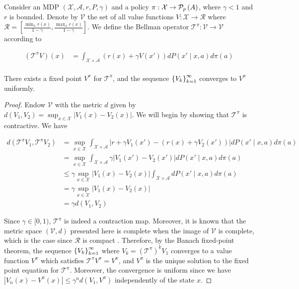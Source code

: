 \begin{theorem}
  Consider an MDP $(\mathcal{X}, \mathcal{A}, r, P, \gamma)$ and a
  policy $\pi:\mathcal{X}\to\probset{A}$, where $\gamma<1$ and $r$ is
  bounded.
  Denote by $\mathcal{V}$ the
  set of all value functions $V:\mathcal{X}\to\mathcal{R}$ where
  $\mathcal{R}=[\frac{\min_x r(x)}{1-\gamma}, \frac{\max_x r(x)}{1-\gamma}]$.
  We define the Bellman
  operator $\mathcal{T}^\pi:\mathcal{V}\to\mathcal{V}$ according to

  \begin{align*}
    (\mathcal{T}^\pi V)(x) &=
                             \int_{\mathcal{X}\times\mathcal{A}}\left(r(x)
                             + \gamma V(x')\right)dP(x'\mid x, a)d\pi(a)\\
  \end{align*}

  There exists a fixed point $V^\pi$ for $\mathcal{T}^\pi$, and the
  sequence $\indexedint{k}{\infty}{V}$ converges to $V^\pi$ uniformly.
\end{theorem}
\begin{proof}
  Endow $\mathcal{V}$ with the metric $d$ given by $d(V_1, V_2) =
  \sup_{x\in\mathcal{X}}|V_1(x) - V_2(x)|$.
  We will begin by showing that $\mathcal{T}^\pi$ is contractive. We
  have

  \begin{align*}
    d(\mathcal{T}^\pi V_1, \mathcal{T}^\pi V_2)
    &=
      \sup_{x\in\mathcal{X}}\int_{\mathcal{X}\times\mathcal{A}}\lvert
      r + \gamma V_1(x') - (r(x) + \gamma V_2(x'))\rvert dP(x'\mid x, a)d\pi(a)\\
    &=
      \sup_{x\in\mathcal{X}}\int_{\mathcal{X}\times\mathcal{A}}\gamma\lvert
      V_1(x') - V_2(x')\rvert dP(x'\mid x, a)d\pi(a)\\
    &\leq
      \gamma\sup_{x\in\mathcal{X}}|V_1(x) -
      V_2(x)|\int_{\mathcal{X}\times\mathcal{A}}dP(x'
      \mid x, a)d\pi(a)\\
    &= \gamma\sup_{x\in\mathcal{X}}|V_1(x) - V_2(x)|\\
    &= \gamma d(V_1, V_2)
  \end{align*}

  Since $\gamma\in [0,1)$, $\mathcal{T}^\pi$ is indeed a contraction
  map. Moreover, it is known that the metric space $(\mathcal{V}, d)$ presented
  here is complete when the image of $\mathcal{V}$ is complete, which
  is the case since $\mathcal{R}$ is compact
  \citep{kreyszig1978introductory}. Therefore, by the Banach
  fixed-point theorem, the sequence $\indexedint{k}{\infty}{V}$ where $V_k=(\mathcal{T}^\pi)^kV_1$
  converges to a value function $V^\pi$ which satisfies
  $\mathcal{T}^\pi V^\pi = V^\pi$, and $V^\pi$ is the unique solution
  to the fixed point equation for $\mathcal{T}^\pi$. Moreover, the
  convergence is uniform since we have $|V_n(x) -
  V^\pi(x)|\leq\gamma^nd(V_1, V^\pi)$ independently of the state $x$.
\end{proof}

